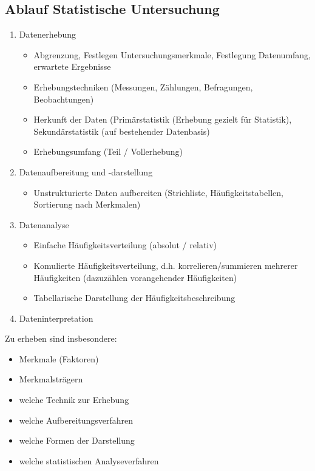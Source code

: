 \subsection{Ablauf Statistische Untersuchung}
\begin{enumerate}
	\item	Datenerhebung
		\begin{itemize}
			\item	Abgrenzung, Festlegen Untersuchungsmerkmale, Festlegung Datenumfang, erwartete Ergebnisse
			\item	Erhebungstechniken (Messungen, Zählungen, Befragungen, Beobachtungen)
			\item	Herkunft der Daten (Primärstatistik (Erhebung gezielt für Statistik), Sekundärstatistik (auf bestehender Datenbasis)
			\item Erhebungsumfang (Teil / Vollerhebung)
		\end{itemize}
	\item	Datenaufbereitung und -darstellung
		\begin{itemize}
			\item Unstrukturierte Daten aufbereiten (Strichliste, Häufigkeitstabellen, Sortierung nach Merkmalen)
		\end{itemize}
	\item	Datenanalyse
		\begin{itemize}
			\item Einfache Häufigkeitsverteilung (absolut / relativ)
			\item Komulierte Häufigkeitsverteilung, d.h. korrelieren/summieren mehrerer Häufigkeiten (dazuzählen vorangehender Häufigkeiten)
			\item Tabellarische Darstellung der Häufigkeitsbeschreibung
		\end{itemize}
	\item	Dateninterpretation
\end{enumerate}

Zu erheben sind insbesondere:
\begin{itemize}
	\item Merkmale (Faktoren)
	\item Merkmalsträgern
	\item welche Technik zur Erhebung
	\item welche Aufbereitungsverfahren
	\item welche Formen der Darstellung
	\item welche statistischen Analyseverfahren
\end{itemize}

